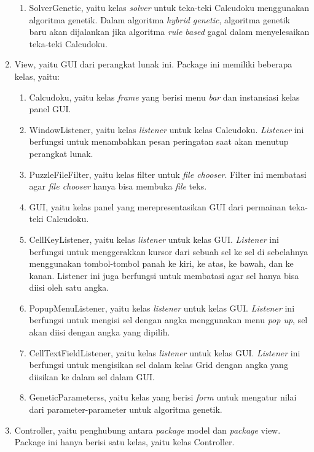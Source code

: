 \begin{enumerate}
\begin{enumerate}
	\item SolverGenetic, yaitu kelas \textit{solver} untuk teka-teki Calcudoku menggunakan algoritma genetik. Dalam algoritma \textit{hybrid genetic}, algoritma genetik baru akan dijalankan jika algoritma \textit{rule based} gagal dalam menyelesaikan teka-teki Calcudoku.
	\end{enumerate}
\item View, yaitu GUI dari perangkat lunak ini. Package ini memiliki beberapa kelas, yaitu:
	\begin{enumerate}
	\item Calcudoku, yaitu kelas \textit{frame} yang berisi menu \textit{bar} dan instansiasi kelas panel GUI.
	\item WindowListener, yaitu kelas \textit{listener} untuk kelas Calcudoku. \textit{Listener} ini berfungsi untuk menambahkan pesan peringatan saat akan menutup perangkat lunak.
	\item PuzzleFileFilter, yaitu kelas filter untuk \textit{file chooser}. Filter ini membatasi agar \textit{file chooser} hanya bisa membuka \textit{file} teks.
	\item GUI, yaitu kelas panel yang merepresentasikan GUI dari permainan teka-teki Calcudoku.
	\item CellKeyListener, yaitu kelas \textit{listener} untuk kelas GUI. \textit{Listener} ini berfungsi untuk menggerakkan kursor dari sebuah sel ke sel di sebelahnya menggunakan tombol-tombol panah ke kiri, ke atas, ke bawah, dan ke kanan. Listener ini juga berfungsi untuk membatasi agar sel hanya bisa diisi oleh satu angka.
	\item PopupMenuListener, yaitu kelas \textit{listener} untuk kelas GUI. \textit{Listener} ini berfungsi untuk mengisi sel dengan angka menggunakan menu \textit{pop up}, sel akan diisi dengan angka yang dipilih.
	\item CellTextFieldListener, yaitu kelas \textit{listener} untuk kelas GUI. \textit{Listener} ini berfungsi untuk mengisikan sel dalam kelas Grid dengan angka yang diisikan ke dalam sel dalam GUI.
	\item GeneticParameterss, yaitu kelas yang berisi \textit{form} untuk mengatur nilai dari parameter-parameter untuk algoritma genetik.
	\end{enumerate}
\item Controller, yaitu penghubung antara \textit{package} model dan \textit{package} view. Package ini hanya berisi satu kelas, yaitu kelas Controller.
\end{enumerate}

